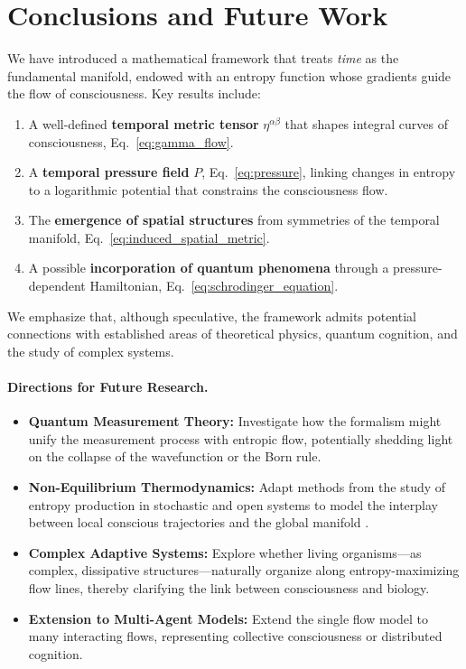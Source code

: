 \documentclass[12pt]{article}
\begin{document}
\section{Conclusions and Future Work}
\label{sec:conclusion}

We have introduced a mathematical framework that treats \emph{time} as the fundamental manifold, endowed with an entropy function whose gradients guide the flow of consciousness. Key results include:

\begin{enumerate}
    \item A well-defined \textbf{temporal metric tensor} $\eta^{\alpha\beta}$ that shapes integral curves of consciousness, Eq.~\eqref{eq:gamma_flow}.
    \item A \textbf{temporal pressure field} $P$, Eq.~\eqref{eq:pressure}, linking changes in entropy to a logarithmic potential that constrains the consciousness flow.
    \item The \textbf{emergence of spatial structures} from symmetries of the temporal manifold, Eq.~\eqref{eq:induced_spatial_metric}.
    \item A possible \textbf{incorporation of quantum phenomena} through a pressure-dependent Hamiltonian, Eq.~\eqref{eq:schrodinger_equation}.
\end{enumerate}

We emphasize that, although speculative, the framework admits potential connections with established areas of theoretical physics, quantum cognition, and the study of complex systems. 

\paragraph{Directions for Future Research.}
\begin{itemize}
    \item \textbf{Quantum Measurement Theory:} Investigate how the formalism might unify the measurement process with entropic flow, potentially shedding light on the collapse of the wavefunction or the Born rule.
    \item \textbf{Non-Equilibrium Thermodynamics:} Adapt methods from the study of entropy production in stochastic and open systems to model the interplay between local conscious trajectories and the global manifold \cite{seifert2012stochastic}.
    \item \textbf{Complex Adaptive Systems:} Explore whether living organisms---as complex, dissipative structures---naturally organize along entropy-maximizing flow lines, thereby clarifying the link between consciousness and biology.
    \item \textbf{Extension to Multi-Agent Models:} Extend the single flow model to many interacting flows, representing collective consciousness or distributed cognition.
\end{itemize}
\end{document}
